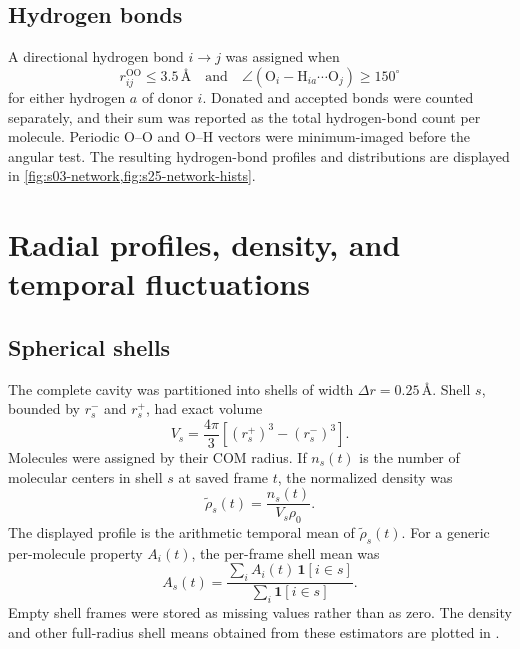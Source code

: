 \documentclass[11pt]{article}
\newcommand{\angstrom}{\text{\AA}}
\newcommand{\OO}{\mathrm{OO}}
\begin{document}
\subsection{Hydrogen bonds}

A directional hydrogen bond \(i\rightarrow j\) was assigned when
\begin{equation}
 r_{ij}^{\OO}\leq3.5\,\angstrom
 \quad\text{and}\quad
 \angle(\mathrm O_i-\mathrm H_{ia}\cdots\mathrm O_j)\geq150^\circ
 \label{eq:hbond}
\end{equation}
for either hydrogen \(a\) of donor \(i\).  Donated and accepted bonds were
counted separately, and their sum was reported as the total hydrogen-bond
count per molecule.  Periodic O--O and O--H vectors were minimum-imaged before
the angular test.
The resulting hydrogen-bond profiles and distributions are displayed in
\cref{fig:s03-network,fig:s25-network-hists}.

\section{Radial profiles, density, and temporal fluctuations}

\subsection{Spherical shells}

The complete cavity was partitioned into shells of width
\(\Delta r=0.25\,\angstrom\).  Shell \(s\), bounded by \(r_s^-\) and
\(r_s^+\), had exact volume
\begin{equation}
 V_s=\frac{4\pi}{3}\left[(r_s^+)^3-(r_s^-)^3\right].
 \label{eq:shell-volume}
\end{equation}
Molecules were assigned by their COM radius.  If \(n_s(t)\) is the number of
molecular centers in shell \(s\) at saved frame \(t\), the normalized density
was
\begin{equation}
 \widetilde\rho_s(t)=\frac{n_s(t)}{V_s\rho_0}.
 \label{eq:density}
\end{equation}
The displayed profile is the arithmetic temporal mean of
\(\widetilde\rho_s(t)\).  For a generic per-molecule property \(A_i(t)\), the
per-frame shell mean was
\begin{equation}
 A_s(t)=\frac{\sum_i A_i(t)\,\mathbf 1[i\in s]}
 {\sum_i\mathbf 1[i\in s]}.
 \label{eq:frame-shell-mean}
\end{equation}
Empty shell frames were stored as missing values rather than as zero.
The density and other full-radius shell means obtained from these estimators
are plotted in .
\end{document}

